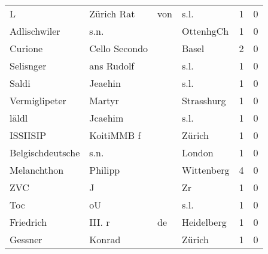 \begin{tabular}{llllrr}
                        L &                         Zürich Rat &         von &                                        s.l. &          1 &         0 \\
             Adlischwiler &                               s.n. &             &                                   OttenhgCh &          1 &         0 \\
                  Curione &                      Cello Secondo &             &                                       Basel &          2 &         0 \\
                Selisnger &                         ans Rudolf &             &                                        s.l. &          1 &         0 \\
                    Saldi &                            Jeaehin &             &                                        s.l. &          1 &         0 \\
            Vermiglipeter &                             Martyr &             &                                  Strasshurg &          1 &         0 \\
                    läldl &                            Jcaehim &             &                                        s.l. &          1 &         0 \\
                 ISSIISIP &                         KoitiMMB f &             &                                      Zürich &          1 &         0 \\
         Belgischdeutsche &                               s.n. &             &                                      London &          1 &         0 \\
              Melanchthon &                            Philipp &             &                                  Wittenberg &          4 &         0 \\
                      ZVC &                                  J &             &                                          Zr &          1 &         0 \\
                      Toc &                                 oU &             &                                        s.l. &          1 &         0 \\
                Friedrich &                            III.  r &          de &                                  Heidelberg &          1 &         0 \\
                  Gessner &                             Konrad &             &                                      Zürich &          1 &         0 \\

\end{tabular}
